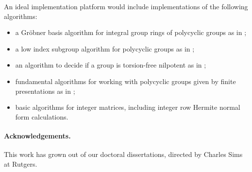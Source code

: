 An ideal implementation platform would include implementations of the following
algorithms:
\begin{itemize}
\item a Gr\"obner basis algorithm
for integral group rings of polycyclic
groups as in \cite{Lo:jscpqa};
\item a low index subgroup algorithm for polycyclic groups as in
\cite{Lo:finiteindex};
\item an algorithm to decide 
if a group is torsion-free nilpotent as in \cite{GO:thesis};
\item fundamental algorithms for working with polycyclic groups
given by finite presentations as in \cite{Sims};
\item basic algorithms for integer matrices, including
integer row Hermite normal form calculations.
\end{itemize}

\paragraph{Acknowledgements.}
This work has grown out of our doctoral dissertations,
directed by Charles Sims at Rutgers.







